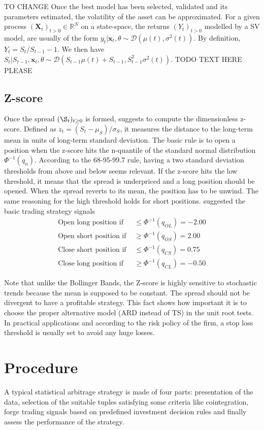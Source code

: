 \documentclass[11pt,a4,twosided,singlespacing,titlepagenumber=on]{scrreprt}
\numberwithin{equation}{chapter} %
\theoremstyle{remark}
\newcommand{\matr}[1]{\mathbf{#1}}
\begin{document}
TO CHANGE
Once the best model has been selected, validated and its parameters estimated, the volatility of the asset can be approximated. For a given process $(\matr{X}_t)_{t>0} \in \mathbb{R}^N$ on a state-space, the returns $(Y_t)_{t>0}$ modelled by a SV model, are usually of the form $y_t | \matr{x}_t, \theta \sim \mathcal{D}(\mu(t), \sigma^2(t))$. By definition, $Y_t = S_t / S_{t-1} - 1$. We then have $S_t | S_{t-1}, \matr{x}_t, \theta \sim \mathcal{D}(S_{t-1} \mu(t)+S_{t-1}, S_{t-1}^2 \sigma^2(t))$. TODO TEXT HERE PLEASE


\section{Z-score}
Once the spread $(\S_t)_{t \geq 0}$ is formed, \cite{caldeira2013} suggests to compute the dimensionless z-score. Defined as $z_t = (S_t-\mu_S) / \sigma_S$, it measures the distance to the long-term mean in units of long-term standard deviation. The basic rule is to open a position when the z-score hits the n-quantile of the standard normal distribution $\Phi^{-1}(q_n)$. According to the 68-95-99.7 rule, having a two standard deviation thresholds from above and below seems relevant. If the z-score hits the low threshold, it means that the spread is underpriced and a long position should be opened. When the spread reverts to its mean, the position has to be unwind. The same reasoning for the high threshold holds for short positions. \cite{caldeira2013} suggested the basic trading strategy signals
\begin{align*}
\text{Open long position if } &\leq \Phi^{-1}(q_{OL}) = -2.00\\
\text{Open short position if } &\geq \Phi^{-1}(q_{OS}) = 2.00\\
\text{Close short position if } &\leq \Phi^{-1}(q_{CS}) = 0.75\\
\text{Close long position if } &\geq \Phi^{-1}(q_{CL}) = -0.50
\end{align*}


Note that unlike the Bollinger Bands, the Z-score is highly sensitive to stochastic trends because the mean is supposed to be constant. The spread should not be divergent to have a profitable strategy. This fact shows how important it is to choose the proper alternative model (ARD instead of TS) in the unit root tests. In practical applications and according to the risk policy of the firm, a stop loss threshold is usually set to avoid any huge losses.

\chapter{Procedure}
A typical statistical arbitrage strategy is made of four parts: presentation of the data, selection of the suitable tuples satisfying some criteria like cointegration, forge trading signals based on predefined investment decision rules and finally assess the performance of the strategy.
\end{document}
